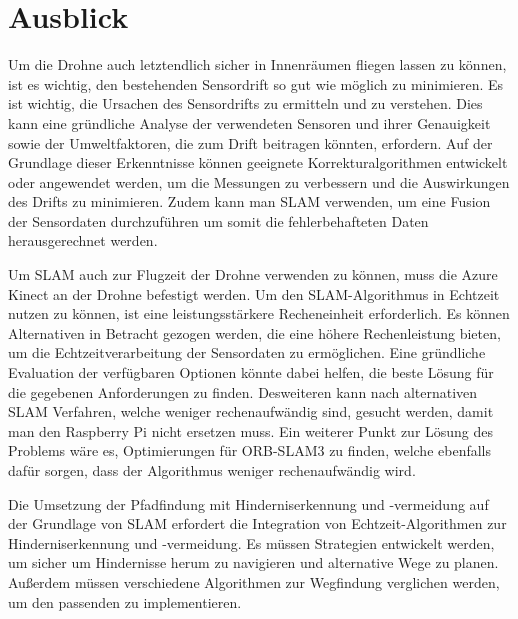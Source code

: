 \section{Ausblick}
Um die Drohne auch letztendlich sicher in Innenräumen fliegen lassen zu können, ist es wichtig, den bestehenden Sensordrift so gut wie möglich zu minimieren. Es ist wichtig, die Ursachen des Sensordrifts zu ermitteln und zu verstehen. Dies kann eine gründliche Analyse der verwendeten Sensoren und ihrer Genauigkeit sowie der Umweltfaktoren, die zum Drift beitragen könnten, erfordern. Auf der Grundlage dieser Erkenntnisse können geeignete Korrekturalgorithmen entwickelt oder angewendet werden, um die Messungen zu verbessern und die Auswirkungen des Drifts zu minimieren. Zudem kann man SLAM verwenden, um eine Fusion der Sensordaten durchzuführen um somit die fehlerbehafteten Daten herausgerechnet werden. 

Um SLAM auch zur Flugzeit der Drohne verwenden zu können, muss die Azure Kinect an der Drohne befestigt werden.
Um den SLAM-Algorithmus in Echtzeit nutzen zu können, ist eine leistungsstärkere Recheneinheit erforderlich. Es können Alternativen in Betracht gezogen werden, die eine höhere Rechenleistung bieten, um die Echtzeitverarbeitung der Sensordaten zu ermöglichen. Eine gründliche Evaluation der verfügbaren Optionen könnte dabei helfen, die beste Lösung für die gegebenen Anforderungen zu finden. Desweiteren kann nach alternativen SLAM Verfahren, welche weniger rechenaufwändig sind, gesucht werden, damit man den Raspberry Pi nicht ersetzen muss. Ein weiterer Punkt zur Lösung des Problems wäre es, Optimierungen für ORB-SLAM3 zu finden, welche ebenfalls dafür sorgen, dass der Algorithmus weniger rechenaufwändig wird. 

Die Umsetzung der Pfadfindung mit Hinderniserkennung und -vermeidung auf der Grundlage von SLAM erfordert die Integration von Echtzeit-Algorithmen zur Hinderniserkennung und -vermeidung. Es müssen Strategien entwickelt werden, um sicher um Hindernisse herum zu navigieren und alternative Wege zu planen. Außerdem müssen verschiedene Algorithmen zur Wegfindung verglichen werden, um den passenden zu implementieren.